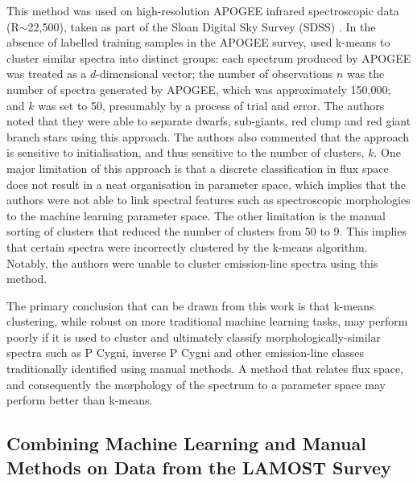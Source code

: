 This method was used on high-resolution APOGEE infrared spectroscopic data (R$\sim$22,500), taken as part of the Sloan Digital Sky Survey (SDSS) \citep{eisenstein2001spectroscopic, blanton2017sloan}. In the absence of labelled training samples in the APOGEE survey, \citet{garcia2018machine} used k-means to cluster similar spectra into distinct groups: each spectrum produced by APOGEE was treated as a $d$-dimensional vector; the number of observations $n$ was the number of spectra generated by APOGEE, which was approximately 150,000; and $k$ was set to 50, presumably by a process of trial and error. The authors noted that they were able to separate dwarfs, sub-giants, red clump and red giant branch stars using this approach. The authors also commented that the approach is sensitive to initialisation, and thus sensitive to the number of clusters, $k$. One major limitation of this approach is that a discrete classification in flux space does not result in a neat organisation in parameter space, which implies that the authors were not able to link spectral features such as spectroscopic morphologies to the machine learning parameter space. The other limitation is the manual sorting of clusters that reduced the number of clusters from 50 to 9. This implies that certain spectra were incorrectly clustered by the k-means algorithm. Notably, the authors were unable to cluster emission-line spectra using this method. 

The primary conclusion that can be drawn from this work is that k-means clustering, while robust on more traditional machine learning tasks, may perform poorly if it is used to cluster and ultimately classify morphologically-similar spectra such as P Cygni, inverse P Cygni and other emission-line classes traditionally identified using manual methods. A method that relates flux space, and consequently the morphology of the spectrum to a parameter space may perform better than k-means. 

\subsection{Combining Machine Learning and Manual Methods on Data from the LAMOST Survey}

